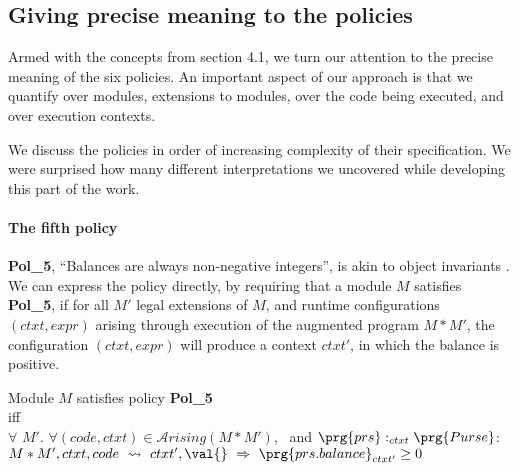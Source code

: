\subsection{Giving precise meaning to the policies} %

Armed with the concepts from section 4.1, we turn our attention to   the
precise meaning  of the six policies. An important aspect of  our
 approach is that we quantify over modules, extensions to
modules, over the code being executed, and over execution contexts.

We discuss the policies in  order of increasing complexity of their specification. We were surprised how many different interpretations we uncovered while developing this part of the work.




 \paragraph{The fifth policy}
  {\bf Pol\_5}, ``Balances are always non-negative integers'', is akin to object invariants \cite{Mey88,Parkinson07,pubsdoc:invariants-iwaco09}. We can  express the policy directly, by requiring that a module $M$ satisfies {\bf Pol\_5},
if for all $M'$ legal extensions of $M$, and  runtime configurations $(ctxt, expr)$  arising through execution of the 
augmented program  $M*M'$, the configuration $(ctxt, expr)$ will produce a context $ctxt'$, in which the balance is positive.


\begin{shaded}
\begin{center}
Module $M$ satisfies policy {\bf Pol\_5}\\ iff\\  $ \forall$ $M'$. $\forall (code,ctxt)
\in{\mathcal A}rising(M*M')$, \ and  $\prg{prs}:_{ctxt}\prg{Purse}$: \\
$ M*M', ctxt, code \ \leadsto \   ctxt', \val{}   \ \Rightarrow\  \prg{prs.balance}_{ctxt'}\geq 0$
 \end{center}
\end{shaded}

